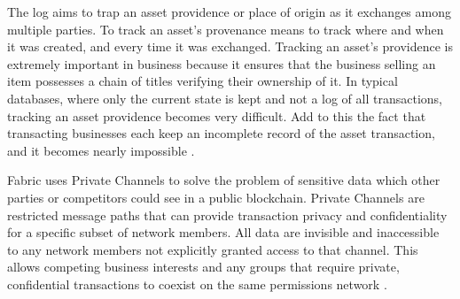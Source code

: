 The log aims to trap an asset providence or place of origin as it exchanges among multiple parties. To track an asset's provenance means to track where and when it was created, and every time it was exchanged. Tracking an asset's providence is extremely important in business because it ensures that the business selling an item possesses a chain of titles verifying their ownership of it. In typical databases, where only the current state is kept and not a log of all transactions, tracking an asset providence becomes very difficult. Add to this the fact that transacting businesses each keep an incomplete record of the asset transaction, and it becomes nearly impossible \cite{blockgeeks2016blockchain}.

Fabric uses Private Channels to solve the problem of sensitive data which other parties or competitors could see in a public blockchain. Private Channels are restricted message paths that can provide transaction privacy and confidentiality for a specific subset of network members. All data are invisible and inaccessible to any network members not explicitly granted access to that channel. This allows competing business interests and any groups that require private, confidential transactions to coexist on the same permissions network \cite{brabbani2017hashing}.
